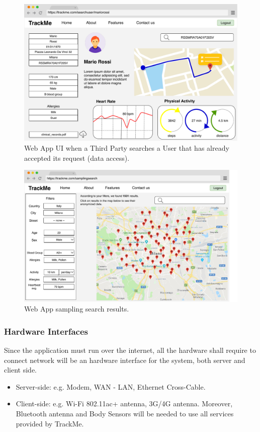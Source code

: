\documentclass[12pt,a4paper]{article}
\begin{document}
					\begin{figure}[H]
						\centering
						\includegraphics[height=0.6\linewidth]{Images/webapp_search_user}
						\caption{Web App UI when a Third Party searches a User that has already accepted its request (data access).}
						\label{fig:webapp_search_user}
					\end{figure}
					\begin{figure}[H]
						\centering
						\includegraphics[height=0.6\linewidth]{Images/webapp_sampling}
						\caption{Web App sampling search results.}
						\label{fig:webapp_sampling}
					\end{figure}
					

	\newpage
	\subsubsection{Hardware Interfaces}
		Since the application must run over the internet, all the hardware shall require to connect network will be an hardware interface for the system, both server and client side.
		\begin{itemize}
			\item Server-side: e.g. Modem, WAN - LAN, Ethernet Cross-Cable.
			\item Client-side: e.g. Wi-Fi 802.11ac+ antenna, 3G/4G antenna. Moreover, Bluetooth antenna and Body Sensors will be needed to use all services provided by TrackMe. 
		\end{itemize}
\end{document}
